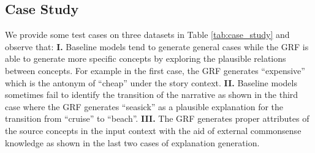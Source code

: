 \documentclass[11pt,a4paper]{article}
\begin{document}



\subsection{Case Study}

We provide some test cases on three datasets in Table \ref{tab:case_study} and observe that: \textbf{I.} Baseline models tend to generate general cases while the GRF is able to generate more specific concepts by exploring the plausible relations between concepts. For example in the first case, the GRF generates ``expensive'' which is the antonym of ``cheap'' under the story context. \textbf{II.} Baseline models sometimes fail to identify the transition of the narrative as shown in the third case where the GRF generates ``seasick'' as a plausible explanation for the transition from ``cruise'' to ``beach''. \textbf{III.} The GRF generates proper attributes of the source concepts in the input context with the aid of external commonsense knowledge as shown in the last two cases of explanation generation.
\end{document}
